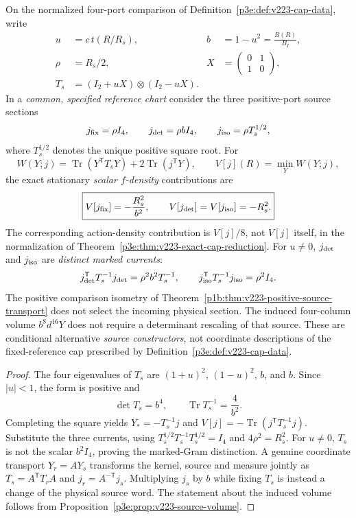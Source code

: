\documentclass[12pt,a4paper]{article}
\begin{document}
\begin{proposition}
\label{p3e:prop:v3028-marked-source-trichotomy}
On the normalized four-port comparison of
Definition~\ref{p3e:def:v223-cap-data}, write
\[
\begin{aligned}
 u&=c\,t(R/R_s),& b&=1-u^2=\frac{B(R)}{B_I},\\
 \rho&=R_s/2,& X&=\begin{pmatrix}0&1\\1&0\end{pmatrix},\\
 T_s&=(I_2+uX)\otimes(I_2-uX).
\end{aligned}
\]
In a \emph{common, specified reference chart} consider the three
positive-port source sections
\[
 j_{\rm fix}=\rho I_4,\qquad
 j_{\rm det}=\rho bI_4,\qquad
 j_{\rm iso}=\rho T_s^{1/2},
\]
where $T_s^{1/2}$ denotes the unique positive square root.  For
\[
 W(Y;j)=\operatorname{Tr}(Y^{\mathsf T}T_sY)
       +2\operatorname{Tr}(j^{\mathsf T}Y),\qquad
 V[j](R)=\min_Y W(Y;j),
\]
the exact stationary \emph{scalar $f$-density} contributions are
\[
 \boxed{V[j_{\rm fix}]=-\frac{R_s^2}{b^2},\qquad
        V[j_{\rm det}]=V[j_{\rm iso}]=-R_s^2.}
\]
The corresponding action-density contribution is $V[j]/8$, not
$V[j]$ itself, in the normalization of
Theorem~\ref{p3e:thm:v223-exact-cap-reduction}.  For $u\ne0$,
$j_{\rm det}$ and $j_{\rm iso}$ are \emph{distinct marked currents}:
\[
 j_{\rm det}^{\mathsf T}T_s^{-1}j_{\rm det}
     =\rho^2b^2T_s^{-1},\qquad
 j_{\rm iso}^{\mathsf T}T_s^{-1}j_{\rm iso}=\rho^2 I_4.
\]
The positive comparison isometry of
Theorem~\ref{p1b:thm:v223-positive-source-transport}
does not select the incoming physical section.  The induced
four-column volume $b^8d^{16}Y$ does not require a determinant
rescaling of that source.  These are conditional alternative
\emph{source constructors}, not coordinate descriptions of the
fixed-reference cap prescribed by
Definition~\ref{p3e:def:v223-cap-data}.
\end{proposition}
\begin{proof}
The four eigenvalues of $T_s$ are $(1+u)^2$, $(1-u)^2$,
$b$, and $b$.  Since $|u|<1$, the form is positive and
\[
 \det T_s=b^4,\qquad \operatorname{Tr}T_s^{-1}=\frac4{b^2}.
\]
Completing the square yields
$Y_*=-T_s^{-1}j$ and
$V[j]=-\operatorname{Tr}(j^{\mathsf T}T_s^{-1}j)$.
Substitute the three currents, using
$T_s^{1/2}T_s^{-1}T_s^{1/2}=I_4$ and $4\rho^2=R_s^2$.
For $u\ne0$, $T_s$ is not the scalar $b^2I_4$, proving the
marked-Gram distinction. A genuine coordinate transport
$Y_r=AY_s$ transforms the kernel, source and measure jointly as
$T_s=A^{\mathsf T}T_rA$ and $j_r=A^{-\mathsf T}j_s$.
Multiplying $j_s$ by $b$ while fixing $T_s$ is instead a change of
the physical source word.  The statement about the induced volume
follows from Proposition~\ref{p3e:prop:v223-source-volume}.
\end{proof}
\end{document}
